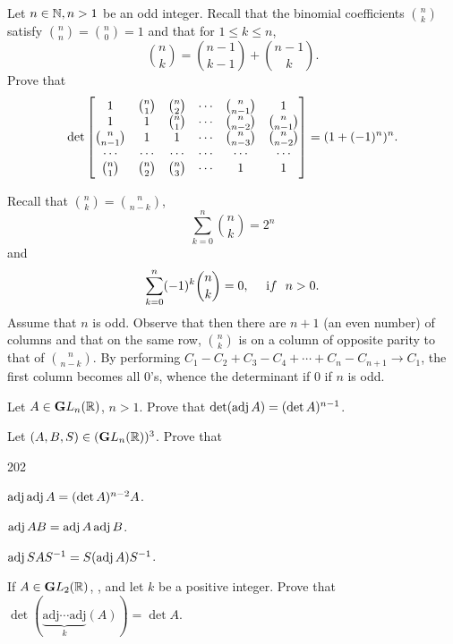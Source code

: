 \begin{pro}
Let $n\in\BBN , n > 1$ be an odd integer. Recall that the binomial
coefficients $\binom{n}{k}$ satisfy $\binom{n}{n} = \binom{n}{0} =
1$ and that for $1 \leq k \leq n$,
$$\binom{n}{k} = \binom{n - 1}{k - 1} + \binom{n - 1}{k}.  $$Prove that
$$ \det\begin{bmatrix} 1 & \binom{n}{1} & \binom{n}{2} & \cdots & \binom{n}{n - 1} & 1 \cr
1 & 1 & \binom{n}{1} & \cdots & \binom{n}{n - 2} & \binom{n}{n -
1} \cr \binom{n}{n - 1} & 1 & 1 & \cdots & \binom{n}{n - 3} &
\binom{n}{n - 2} \cr
 \cdots  &  \cdots  &  \cdots  & \cdots &  \cdots  &  \cdots  \cr
 \binom{n}{1} & \binom{n}{2} & \binom{n}{3} & \cdots & 1 & 1 \cr
 \end{bmatrix}  = (1 + (-1)^n)^n.$$
\begin{answer} Recall
that $\binom{n}{k} = \binom{n}{n - k}$, $$ \sum _{k = 0} ^n
\binom{n}{k} = 2^n  $$ and$$ \sum _{k = 0} ^n (-1)^{k}\binom{n}{k}
= 0, \ \ \ \ {\textrm  if}\ \ n > 0. $$ Assume that $n$ is odd. Observe
that then there are $n + 1$  (an even number) of columns and that
on the same row, $\binom{n}{k}$ is on a column of opposite parity
to that of $\binom{n}{n - k}$. By performing  $C_1 - C_2 + C_3 -
C_4 + \cdots + C_n - C_{n + 1} \rightarrow C_1$, the first column
becomes all $0$'s, whence the determinant if $0$ if $n$ is odd.
\end{answer}
\end{pro}
\begin{pro}
Let $A\in\gl{n}{ \bbR}$, $n>1$. Prove that $\det (\adj{A}) = (\det
A)^{n-1}$.
\end{pro}
\begin{pro} Let $(A, B, S)\in(\gl{n}{ \bbR})^3$. Prove that\begin{dingautolist}{202} \item $
\adj{\adj{A}} = (\det A)^{n-2}A$.

\item $\adj{AB} = \adj{A}\adj{B}$. \item $\adj{SAS^{-1}} = S(\adj{
A})S^{-1}$.
\end{dingautolist}\end{pro}
\begin{pro} If $A\in\gl{2}{\bbR}$, ,  and let  $k$ be
a positive integer. Prove that $\det (\underbrace{\mathrm{adj}
\cdots \mathrm{adj}}_{k}(A)) = \det A$.
\end{pro}
